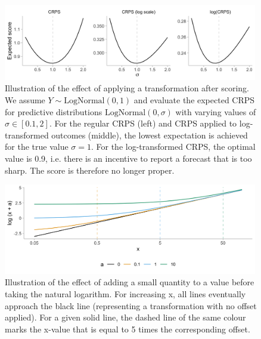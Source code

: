 \documentclass{article}
\begin{document}
\begin{figure}[h!]
    \centering
    \includegraphics[width=0.99\textwidth]{output/figures/example-log-first.png}
    \caption{Illustration of the effect of applying a transformation after scoring. We assume $Y \sim \text{LogNormal}(0, 1)$ and evaluate the expected CRPS for predictive distributions $\text{LogNormal}(0, \sigma)$ with varying values of $\sigma \in [0.1, 2]$. For the regular CRPS (left) and CRPS applied to log-transformed outcomes (middle), the lowest expectation is achieved for the true value $\sigma = 1$. For the log-transformed CRPS, the optimal value is  0.9, i.e. there is an incentive to report a forecast that is too sharp. The score is therefore no longer proper.}
    \label{fig:log-improper}
\end{figure}



\begin{figure}[h!]
    \centering
    \includegraphics[width=0.99\textwidth]{output/figures/illustration-effect-offset-log.png}
    \caption{Illustration of the effect of adding a small quantity to a value before taking the natural logarithm. For increasing x, all lines eventually approach the black line (representing a transformation with no offset applied).
    For a given solid line, the dashed line of the same colour marks the x-value that  is equal to 5 times the corresponding offset.}
    \label{fig:illustration-effect-log-offset}
\end{figure}
\end{document}
